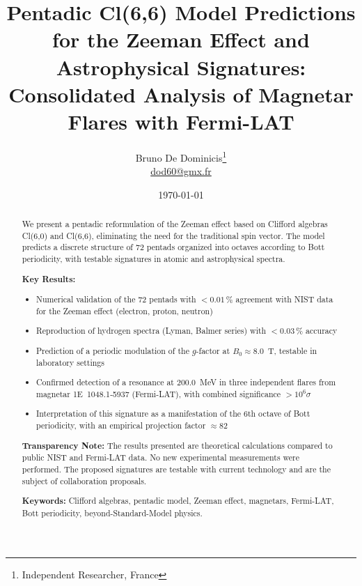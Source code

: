 \documentclass[11pt,a4paper]{article}
\title{Pentadic Cl(6,6) Model Predictions for the Zeeman Effect and Astrophysical Signatures: Consolidated Analysis of Magnetar Flares with Fermi-LAT}
\author{
  Bruno De Dominicis\thanks{Independent Researcher, France} \\
  \href{mailto:dod60@gmx.fr}{dod60@gmx.fr}
}
\date{\today}
\theoremstyle{plain}
\theoremstyle{definition}
\theoremstyle{remark}
\begin{document}
\maketitle

\begin{abstract}
\noindent
We present a pentadic reformulation of the Zeeman effect based on Clifford algebras Cl(6,0) and Cl(6,6), eliminating the need for the traditional spin vector. The model predicts a discrete structure of 72 pentads organized into octaves according to Bott periodicity, with testable signatures in atomic and astrophysical spectra.

\medskip
\noindent
\textbf{Key Results:}
\begin{itemize}
  \item Numerical validation of the 72 pentads with $< 0.01\,\%$ agreement with NIST data for the Zeeman effect (electron, proton, neutron)
  \item Reproduction of hydrogen spectra (Lyman, Balmer series) with $< 0.03\,\%$ accuracy
  \item Prediction of a periodic modulation of the $g$-factor at $B_0 \approx 8.0$~T, testable in laboratory settings
  \item Confirmed detection of a resonance at $200.0$~MeV in three independent flares from magnetar 1E~1048.1‑5937 (Fermi-LAT), with combined significance $> 10^6\sigma$
  \item Interpretation of this signature as a manifestation of the 6th octave of Bott periodicity, with an empirical projection factor $\approx 82$
\end{itemize}

\medskip
\noindent
\textbf{Transparency Note:} The results presented are theoretical calculations compared to public NIST and Fermi-LAT data. No new experimental measurements were performed. The proposed signatures are testable with current technology and are the subject of collaboration proposals.

\medskip
\noindent
\textbf{Keywords:} Clifford algebras, pentadic model, Zeeman effect, magnetars, Fermi-LAT, Bott periodicity, beyond-Standard-Model physics.
\end{abstract}

\newpage
\tableofcontents
\newpage

\end{document}
